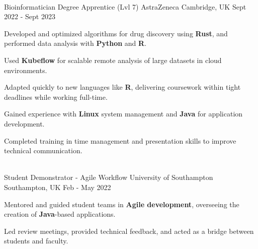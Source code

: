 \begin{cventries}
{    }
    \\[20pt]
    \cventry
    {Bioinformatician Degree Apprentice (Lvl 7)} %
    {AstraZeneca} %
    {Cambridge, UK} %
    {Sept 2022 - Sept 2023} %
    {
      \begin{cvitems}
        \item {Developed and optimized algorithms for drug discovery using \textbf{Rust}, and performed data analysis with \textbf{Python} and \textbf{R}.}
        \item {Used \textbf{Kubeflow} for scalable remote analysis of large datasets in cloud environments.}
        \item {Adapted quickly to new languages like \textbf{R}, delivering coursework within tight deadlines while working full-time.}
        \item {Gained experience with \textbf{Linux} system management and \textbf{Java} for application development.}
        \item {Completed training in time management and presentation skills to improve technical communication.}
      \end{cvitems}
    }
    \\[15pt]
    \cventry
    {Student Demonstrator - Agile Workflow} %
    {University of Southampton} %
    {Southampton, UK} %
    {Feb - May 2022} %
    {
      \begin{cvitems}
        \item {Mentored and guided student teams in \textbf{Agile development}, overseeing the creation of \textbf{Java}-based applications.}
        \item {Led review meetings, provided technical feedback, and acted as a bridge between students and faculty.}
      \end{cvitems}
    }
\end{cventries}
